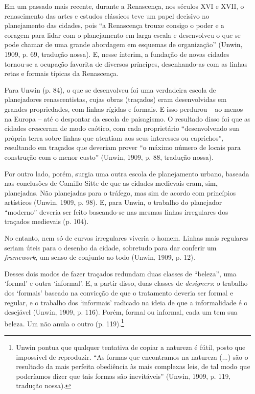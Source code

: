 \documentclass[12pt, a4paper]{book} %
\begin{document}
        Em um passado mais recente, durante a Renascença, nos séculos XVI e XVII, o renascimento das artes e estudos clássicos teve um papel decisivo no planejamento das cidades, pois ``a Renascença trouxe consigo o poder e a coragem para lidar com o planejamento em larga escala e desenvolveu o que se pode chamar de uma grande abordagem em esquemas de organização'' (Unwin, 1909, p. 69, tradução nossa). E, nesse ínterim, a fundação de novas cidades tornou-se a ocupação favorita de diversos príncipes, desenhando-as com as linhas retas e formais típicas da Renascença.

        Para Unwin (p. 84), o que se desenvolveu foi uma verdadeira escola de planejadores renascentistas, cujas obras (traçados) eram desenvolvidas em grandes propriedades, com linhas rígidas e formais. E isso perdurou – ao menos na Europa – até o despontar da escola de paisagismo. O resultado disso foi que as cidades cresceram de modo caótico, com cada proprietário ``desenvolvendo sua própria terra sobre linhas que atentiam aos seus interesses ou caprichos'', resultando em traçados que deveriam prover ``o máximo número de locais para construção com o menor custo'' (Unwin, 1909, p. 88, tradução nossa).

        Por outro lado, porém, surgia uma outra escola de planejamento urbano, baseada nas conclusões de Camillo Sitte de que as cidades medievais eram, sim, planejadas. Não planejadas para o tráfego, mas sim de acordo com princípios artísticos (Unwin, 1909, p. 98). E, para Unwin, o trabalho do planejador ``moderno'' deveria ser feito baseando-se nas mesmas linhas irregulares dos traçados medievais (p. 104).
        
        No entanto, nem só de curvas irregulares viveria o homem. Linhas mais regulares seriam úteis para o desenho da cidade, sobretudo para dar conferir um \textit{framework}, um senso de conjunto ao todo (Unwin, 1909, p. 12).
        
        Desses dois modos de fazer traçados redundam duas classes de ``beleza'', uma `formal' e outra `informal'. E, a partir disso, duas classes de \textit{designers}: o trabalho dos `formais' baseado na convicção de que o tratamento deveria ser formal e regular, e o trabalho dos `informais' radicado na ideia de que a informalidade é o desejável (Unwin, 1909, p. 116). Porém, formal ou informal, cada um tem sua beleza. Um não anula o outro (p. 119).\footnote[11]{Unwin pontua que qualquer tentativa de copiar a natureza é fútil, posto que impossível de reproduzir. ``As formas que encontramos na natureza (...) são o resultado da mais perfeita obediência às mais complexas leis, de tal modo que poderíamos dizer que tais formas são inevitáveis'' (Unwin, 1909, p. 119, tradução nossa).}
\end{document}

